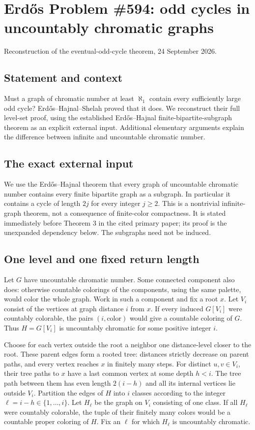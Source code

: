 \section{Erd\H{o}s Problem \#594: odd cycles in uncountably chromatic graphs}
\noindent Reconstruction of the eventual-odd-cycle theorem, 24 September 2026.

\subsection*{Statement and context}
Must a graph of chromatic number at least $\aleph_1$ contain every sufficiently large odd cycle? Erd\H{o}s--Hajnal--Shelah proved that it does. We reconstruct their full level-set proof, using the established Erd\H{o}s--Hajnal finite-bipartite-subgraph theorem as an explicit external input. Additional elementary arguments explain the difference between infinite and uncountable chromatic number.

\subsection*{The exact external input}
We use the Erd\H{o}s--Hajnal theorem that every graph of uncountable chromatic number contains every finite bipartite graph as a subgraph. In particular it contains a cycle of length $2j$ for every integer $j\geq2$. This is a nontrivial infinite-graph theorem, not a consequence of finite-color compactness. It is stated immediately before Theorem 3 in the cited primary paper; its proof is the unexpanded dependency below. The subgraphs need not be induced.

\subsection*{One level and one fixed return length}
Let $G$ have uncountable chromatic number. Some connected component also does: otherwise countable colorings of the components, using the same palette, would color the whole graph. Work in such a component and fix a root $x$. Let $V_i$ consist of the vertices at graph distance $i$ from $x$. If every induced $G[V_i]$ were countably colorable, the pairs $(i,\text{color})$ would give a countable coloring of $G$. Thus $H=G[V_i]$ is uncountably chromatic for some positive integer $i$.

Choose for each vertex outside the root a neighbor one distance-level closer to the root. These parent edges form a rooted tree: distances strictly decrease on parent paths, and every vertex reaches $x$ in finitely many steps. For distinct $u,v\in V_i$, their tree paths to $x$ have a last common vertex at some depth $h<i$. The tree path between them has even length $2(i-h)$ and all its internal vertices lie outside $V_i$.
Partition the edges of $H$ into $i$ classes according to the integer $\ell=i-h\in\{1,\ldots,i\}$. Let $H_\ell$ be the graph on $V_i$ consisting of one class. If all $H_\ell$ were countably colorable, the tuple of their finitely many colors would be a countable proper coloring of $H$. Fix an $\ell$ for which $H_\ell$ is uncountably chromatic.

